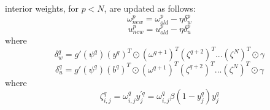 \documentclass{article}
\begin{document}
%
interior weights, for $p < N$, are updated as follows:
%
\begin{equation} \label{eq:w_weights}
\omega_{new}^p = \omega_{old}^p - \eta \delta_w^p
\end{equation}
%
\begin{equation} \label{eq:u_weights}
u_{new}^p = u_{old}^p - \eta \delta_u^p
\end{equation}
%
where
%
\begin{equation} \label{eq:w_delta}
\delta_w^{q} = g'(\psi^{q}) (y^{q})^T \odot (\omega^{q+1})^T (\zeta^{q+2})^T ... (\zeta^N)^T \odot \gamma
\end{equation}
%
\begin{equation} \label{eq:u_delta}
\delta_u^{q} = g'(\psi^{q}) (b^{q})^T \odot (\omega^{q+1})^T (\zeta^{q+2})^T ... (\zeta^N)^T \odot \gamma
\end{equation}
%
where
%
\begin{equation} \label{eq:u_delta}
\zeta_{i,j}^q = \omega_{i,j}^q y_j^{\prime q} = \omega_{i,j}^q \beta (1 - y_j^q) y_j^q
\end{equation}
%
\end{document}
